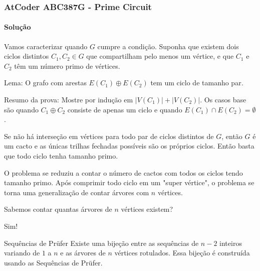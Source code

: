 \documentclass{beamer}
\begin{document}
\begin{frame}[t]
     \frametitle{AtCoder ABC387G - Prime Circuit} %
     \framesubtitle{Solução}
             {
            Vamos caracterizar quando $G$ cumpre a condição. Suponha que existem dois ciclos distintos $C_1, C_2 \in G$ que compartilham pelo menos um vértice, e que $C_1$ e $C_2$ têm um número primo de vértices. 
             {
            \begin{block}{Lema:}
                  O grafo com arestas $E(C_1) \oplus E(C_2)$ tem um ciclo de tamanho par.
            \end{block}
             {
            \begin{block}{Resumo da prova:}
            Mostre por indução em $|V(C_1)| + |V(C_2)|$. Os casos base são quando $C_1 \oplus C_2$ consiste de apenas um ciclo e quando $E(C_1) \cap E(C_2) = \emptyset$.
            \end{block}
            }
            }
            }

             {
            Se não há interseção em vértices para todo par de ciclos distintos de $G$, então $G$ é um cacto e as únicas trilhas fechadas possíveis são os próprios ciclos. Então basta que todo ciclo tenha tamanho primo.
            }
             {

            O problema se reduziu a contar o número de cactos com todos os ciclos tendo tamanho primo. Após comprimir todo ciclo em um "super vértice", o problema se torna uma generalização de contar árvores com $n$ vértices.            

            \vspace{0.5em}

            Sabemos contar quantas árvores de $n$ vértices existem?
             {
                  Sim!
                  \begin{block}{Sequências de Prüfer}
                        Existe uma bijeção entre as sequências de $n-2$ inteiros variando de $1$ a $n$ e as árvores de $n$ vértices rotulados. Essa bijeção é construída usando as Sequências de Prüfer. 
                        
                  \end{block}
            }
            }
\end{frame}
\end{document}
